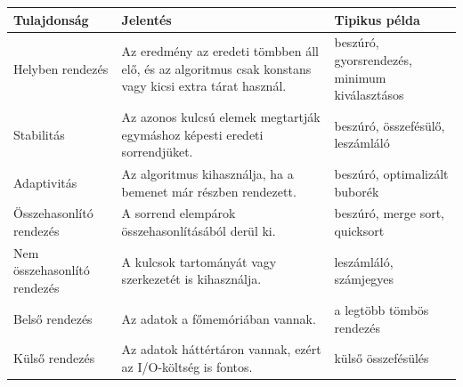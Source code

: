 \begingroup
\setlength{\tabcolsep}{4pt}
\begin{tabularx}{\textwidth}{L{0.24\textwidth}X L{0.26\textwidth}}
\toprule
Tulajdonság & Jelentés & Tipikus példa \\
\midrule
Helyben rendezés & Az eredmény az eredeti tömbben áll elő, és az algoritmus csak konstans vagy kicsi extra tárat használ. & beszúró, gyorsrendezés, minimum kiválasztásos \\
Stabilitás & Az azonos kulcsú elemek megtartják egymáshoz képesti eredeti sorrendjüket. & beszúró, összefésülő, leszámláló \\
Adaptivitás & Az algoritmus kihasználja, ha a bemenet már részben rendezett. & beszúró, optimalizált buborék \\
Összehasonlító rendezés & A sorrend elempárok összehasonlításából derül ki. & beszúró, merge sort, quicksort \\
Nem összehasonlító rendezés & A kulcsok tartományát vagy szerkezetét is kihasználja. & leszámláló, számjegyes \\
Belső rendezés & Az adatok a főmemóriában vannak. & a legtöbb tömbös rendezés \\
Külső rendezés & Az adatok háttértáron vannak, ezért az I/O-költség is fontos. & külső összefésülés \\
\bottomrule
\end{tabularx}
\endgroup
